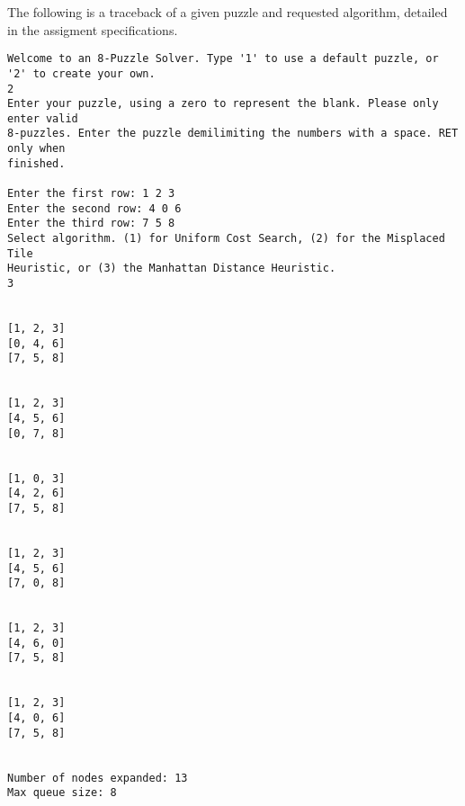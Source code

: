 \documentclass[a4paper]{article}
\begin{document}
The following is a traceback of a given puzzle and requested algorithm, detailed in the assigment specifications.

\begin{verbatim}
Welcome to an 8-Puzzle Solver. Type '1' to use a default puzzle, or '2' to create your own.
2
Enter your puzzle, using a zero to represent the blank. Please only enter valid
8-puzzles. Enter the puzzle demilimiting the numbers with a space. RET only when
finished. 

Enter the first row: 1 2 3
Enter the second row: 4 0 6
Enter the third row: 7 5 8
Select algorithm. (1) for Uniform Cost Search, (2) for the Misplaced Tile
Heuristic, or (3) the Manhattan Distance Heuristic. 
3


[1, 2, 3]
[0, 4, 6]
[7, 5, 8]


[1, 2, 3]
[4, 5, 6]
[0, 7, 8]


[1, 0, 3]
[4, 2, 6]
[7, 5, 8]


[1, 2, 3]
[4, 5, 6]
[7, 0, 8]


[1, 2, 3]
[4, 6, 0]
[7, 5, 8]


[1, 2, 3]
[4, 0, 6]
[7, 5, 8]


Number of nodes expanded: 13
Max queue size: 8
\end{verbatim}
\end{document}
